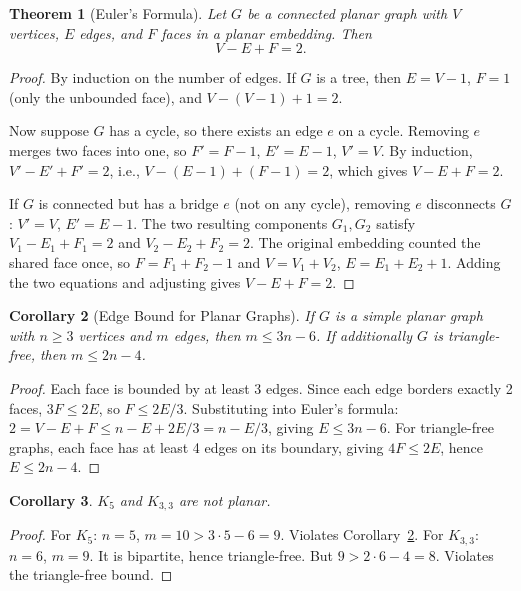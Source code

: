 \documentclass[12pt,a4paper]{amsart}
\newtheorem{theorem}{Theorem}[section]
\newtheorem{corollary}[theorem]{Corollary}
\theoremstyle{definition}
\theoremstyle{remark}
\begin{document}
\begin{theorem}[Euler's Formula]
\label{thm:euler-formula}
Let $G$ be a connected planar graph with $V$ vertices, $E$ edges, and $F$ faces
in a planar embedding. Then
\[
  V - E + F = 2.
\]
\end{theorem}

\begin{proof}
By induction on the number of edges. If $G$ is a tree, then $E = V - 1$,
$F = 1$ (only the unbounded face), and $V - (V-1) + 1 = 2$. \checkmark

Now suppose $G$ has a cycle, so there exists an edge $e$ on a cycle. Removing
$e$ merges two faces into one, so $F' = F - 1$, $E' = E - 1$, $V' = V$.
By induction, $V' - E' + F' = 2$, i.e., $V - (E-1) + (F-1) = 2$, which
gives $V - E + F = 2$. \checkmark

If $G$ is connected but has a bridge $e$ (not on any cycle), removing $e$
disconnects $G$: $V' = V$, $E' = E - 1$. The two resulting components
$G_1, G_2$ satisfy $V_1 - E_1 + F_1 = 2$ and $V_2 - E_2 + F_2 = 2$. The
original embedding counted the shared face once, so $F = F_1 + F_2 - 1$
and $V = V_1 + V_2$, $E = E_1 + E_2 + 1$. Adding the two equations and
adjusting gives $V - E + F = 2$.
\end{proof}

\begin{corollary}[Edge Bound for Planar Graphs]
\label{cor:planar-edges}
If $G$ is a simple planar graph with $n \ge 3$ vertices and $m$ edges, then
$m \le 3n - 6$. If additionally $G$ is triangle-free, then $m \le 2n - 4$.
\end{corollary}

\begin{proof}
Each face is bounded by at least 3 edges. Since each edge borders exactly 2
faces, $3F \le 2E$, so $F \le 2E/3$. Substituting into Euler's formula:
$2 = V - E + F \le n - E + 2E/3 = n - E/3$, giving $E \le 3n - 6$.
For triangle-free graphs, each face has at least 4 edges on its boundary,
giving $4F \le 2E$, hence $E \le 2n - 4$.
\end{proof}

\begin{corollary}
$K_5$ and $K_{3,3}$ are not planar.
\end{corollary}

\begin{proof}
For $K_5$: $n = 5$, $m = 10 > 3 \cdot 5 - 6 = 9$. Violates
Corollary~\ref{cor:planar-edges}.
For $K_{3,3}$: $n = 6$, $m = 9$. It is bipartite, hence triangle-free. But
$9 > 2 \cdot 6 - 4 = 8$. Violates the triangle-free bound.
\end{proof}
\end{document}
